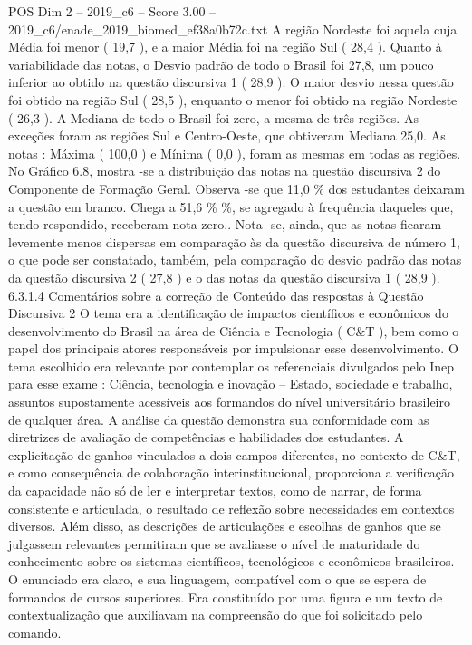 \begin{textsample}{POS Dim 2 – 2019\_c6 – Score 3.00 – 2019\_c6/enade\_2019\_biomed\_ef38a0b72c.txt}
A região Nordeste foi aquela cuja Média foi menor ( 19,7 ), e a maior Média foi na região Sul ( 28,4 ).
Quanto à variabilidade das notas, o Desvio padrão de todo o Brasil foi 27,8, um pouco inferior ao obtido na questão discursiva 1 ( 28,9 ).
O maior desvio nessa questão foi obtido na região Sul ( 28,5 ), enquanto o menor foi obtido na região Nordeste ( 26,3 ).
A Mediana de todo o Brasil foi zero, a mesma de três regiões.
As exceções foram as regiões Sul e Centro-Oeste, que obtiveram Mediana 25,0.
As notas : Máxima ( 100,0 ) e Mínima ( 0,0 ), foram as mesmas em todas as regiões.
No Gráfico 6.8, mostra -se a distribuição das notas na questão discursiva 2 do Componente de Formação Geral.
Observa -se que 11,0 \% dos estudantes deixaram a questão em branco.
Chega a 51,6 \% \%, se agregado à frequência daqueles que, tendo respondido, receberam nota zero..
Nota -se, ainda, que as notas ficaram levemente menos dispersas em comparação às da questão discursiva de número 1, o que pode ser constatado, também, pela comparação do desvio padrão das notas da questão discursiva 2 ( 27,8 ) e o das notas da questão discursiva 1 ( 28,9 ). 6.3.1.4 Comentários sobre a correção de Conteúdo das respostas à Questão Discursiva 2 O tema era a identificação de impactos científicos e econômicos do desenvolvimento do Brasil na área de Ciência e Tecnologia ( C\&T ), bem como o papel dos principais atores responsáveis por impulsionar esse desenvolvimento.
O tema escolhido era relevante por contemplar os referenciais divulgados pelo Inep para esse exame : Ciência, tecnologia e inovação – Estado, sociedade e trabalho, assuntos supostamente acessíveis aos formandos do nível universitário brasileiro de qualquer área.
A análise da questão demonstra sua conformidade com as diretrizes de avaliação de competências e habilidades dos estudantes.
A explicitação de ganhos vinculados a dois campos diferentes, no contexto de C\&T, e como consequência de colaboração interinstitucional, proporciona a verificação da capacidade não só de ler e interpretar textos, como de narrar, de forma consistente e articulada, o resultado de reflexão sobre necessidades em contextos diversos.
Além disso, as descrições de articulações e escolhas de ganhos que se julgassem relevantes permitiram que se avaliasse o nível de maturidade do conhecimento sobre os sistemas científicos, tecnológicos e econômicos brasileiros.
O enunciado era claro, e sua linguagem, compatível com o que se espera de formandos de cursos superiores.
Era constituído por uma figura e um texto de contextualização que auxiliavam na compreensão do que foi solicitado pelo comando.

\end{textsample}
